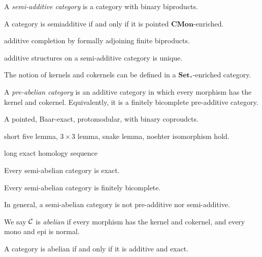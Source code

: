 \documentclass{../../large}
\newcommand{\Set}{\mathbf{Set}}
\newcommand{\CMon}{\mathbf{CMon}}
\begin{document}
\begin{prb}
A \emph{semi-additive category} is a category with binary biproducts.
\begin{parts}
\item A category is semiadditive if and only if it is pointed $\CMon$-enriched.
\end{parts}
\end{prb}


\begin{prb}
\begin{parts}
\item additive completion by formally adjoining finite biproducts.
\item additive structures on a semi-additive category is unique.
\end{parts}
\end{prb}

The notion of kernels and cokernels can be defined in a $\Set_*$-enriched category.


\begin{prb}
A \emph{pre-abelian category} is an additive category in which every morphism has the kernel and cokernel.
Equivalently, it is a finitely bicomplete pre-additive category.
\begin{parts}
\item 
\end{parts}
\end{prb}

\begin{prb}
A pointed, Baar-exact, protomodular, with binary coproudcts.
\begin{parts}
\item short five lemma, $3\times3$ lemma, snake lemma, noehter isomorphism hold.
\item long exact homology sequence
\item Every semi-abelian category is exact.
\item Every semi-abelian category is finitely bicomplete.
\item In general, a semi-abelian category is not pre-additive nor semi-additive.
\end{parts}
\end{prb}

\begin{prb}
We say $\mathcal{C}$ is \emph{abelian} if every morphism has the kernel and cokernel, and every mono and epi is normal.
\begin{parts}
\item A category is abelian if and only if it is additive and exact.
\end{parts}
\end{prb}
\end{document}
